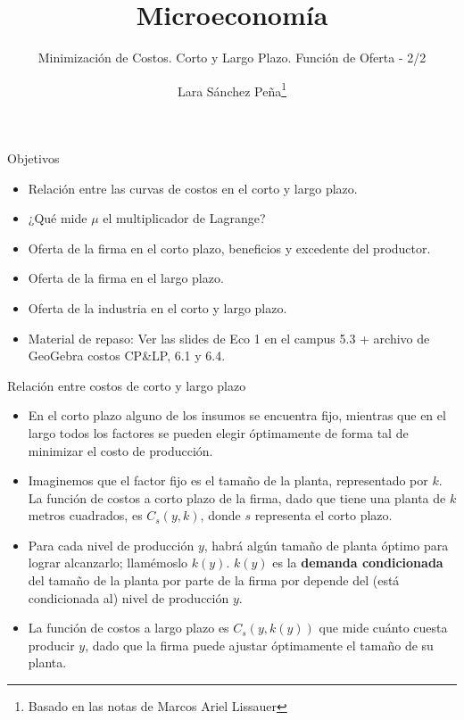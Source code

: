 \documentclass{beamer}
\title{Microeconom\'ia}
\subtitle{Minimizaci\'on de Costos. Corto y Largo Plazo. Funci\'on de Oferta - 2/2 \\ \mydate}
\author[Minimización costos 2/2]{Lara Sánchez Peña\footnote{Basado en las notas de Marcos Ariel Lissauer}}
\institute[]{UTDT}
\date[UTDT 2021]{}
\theoremstyle{definition}
\begin{document}
\begin{frame}
  \titlepage
\end{frame}

\begin{frame}{Objetivos}

\begin{itemize}
\item Relación entre las curvas de costos en el corto y largo plazo.
\item ¿Qué mide $\mu$ el multiplicador de Lagrange?
\item Oferta de la firma en el corto plazo, beneficios y excedente del productor.
\item Oferta de la firma en el largo plazo.
\item Oferta de la industria en el corto y largo plazo.
\item Material de repaso: Ver las slides de Eco 1 en el campus 5.3 + archivo de GeoGebra costos CP\&LP, 6.1 y 6.4.
\end{itemize}
    
\end{frame}

\begin{frame}{Relaci\'on entre costos de corto y largo plazo}
\begin{itemize}
\item En el corto plazo alguno de los insumos se encuentra fijo, mientras que en el largo todos los factores se pueden elegir \'{o}ptimamente de forma tal de minimizar el costo de producci\'{o}n.
\item Imaginemos que el factor fijo es el tamaño de la planta, representado por $k$. La función de costos a corto plazo de la firma, dado que tiene una planta de $k$ metros cuadrados, es $C_s(y, k)$, donde $s$ representa el corto plazo.
\item Para cada nivel de producción $y$, habrá algún tamaño de planta óptimo para lograr alcanzarlo; llamémoslo $k(y)$. $k(y)$ es la \textbf{demanda condicionada} del tamaño de la planta por parte de la firma por depende  del (está condicionada al) nivel de producción $y$.
\item La función de costos a largo plazo es $C_s(y, k(y))$ que mide cuánto cuesta producir $y$, dado que la firma puede ajustar óptimamente el tamaño de su planta.
\end{itemize}
\end{frame}
\end{document}
